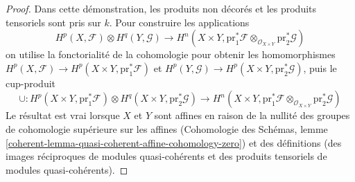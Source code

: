 \begin{proof}
 Dans cette démonstration, les produits non décorés et les produits tensoriels sont pris sur $k$. Pour construire les applications 
$$
H^p(X, \mathcal{F}) \otimes H^q(Y, \mathcal{G})
\longrightarrow
H^n(X \times Y, \text{pr}_1^*\mathcal{F}
\otimes_{\mathcal{O}_{X \times Y}} \text{pr}_2^*\mathcal{G})
$$
 on utilise la fonctorialité de la cohomologie pour obtenir les homomorphismes 
$H^p(X, \mathcal{F}) \to H^p(X \times Y, \text{pr}_1^*\mathcal{F})$ et 
$H^p(Y, \mathcal{G}) \to H^p(X \times Y, \text{pr}_2^*\mathcal{G})$,
puis le cup-produit 
$$
\cup :
H^p(X \times Y, \text{pr}_1^*\mathcal{F})
\otimes H^q(X \times Y, \text{pr}_2^*\mathcal{G})
\longrightarrow
H^n(X \times Y, \text{pr}_1^*\mathcal{F}
\otimes_{\mathcal{O}_{X \times Y}} \text{pr}_2^*\mathcal{G})
$$
 Le résultat est vrai lorsque $X$ et $Y$ sont affines en raison de la
nullité des groupes de cohomologie supérieure sur les affines (Cohomologie des Schémas, lemme 
\ref{coherent-lemma-quasi-coherent-affine-cohomology-zero})
et des définitions (des images réciproques de modules quasi-cohérents et
des produits tensoriels de modules quasi-cohérents).


\end{proof}
